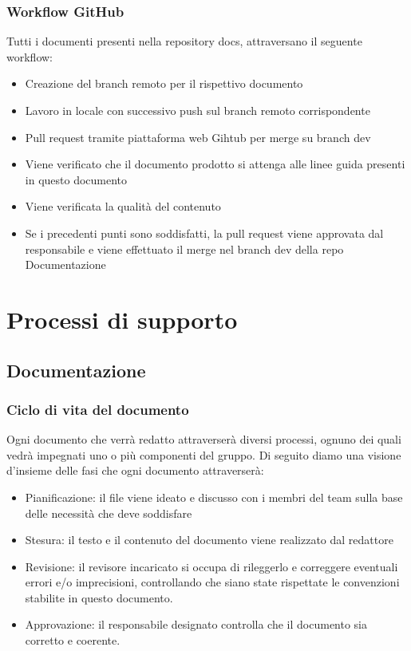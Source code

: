 \documentclass[12pt]{article}
\begin{document}
\subsubsection{Workflow GitHub}
Tutti i documenti presenti nella repository docs, attraversano il seguente workflow:

\begin{itemize}
    \item Creazione del branch remoto per il rispettivo documento
    \item Lavoro in locale con successivo push sul branch remoto corrispondente
    \item Pull request tramite piattaforma web Gihtub per merge su branch dev
    \item Viene verificato che il documento prodotto si attenga alle linee guida presenti in questo documento
    \item Viene verificata la qualità del contenuto 
    \item Se i precedenti punti sono soddisfatti, la pull request viene approvata dal responsabile e viene effettuato il merge nel branch dev della repo Documentazione
\end{itemize}

\section{Processi di supporto}

\subsection{Documentazione}
\subsubsection{Ciclo di vita del documento}
Ogni documento che verrà redatto attraverserà diversi processi, ognuno dei quali vedrà impegnati uno o più componenti del gruppo.
Di seguito diamo una visione d'insieme delle fasi che ogni documento attraverserà:
\begin{itemize}
    \item Pianificazione: il file viene ideato e discusso con i membri del team sulla base delle necessità che deve soddisfare
    \item Stesura: il testo e il contenuto del documento viene realizzato dal redattore
    \item Revisione: il revisore incaricato si occupa di rileggerlo e correggere eventuali errori e/o imprecisioni, controllando che siano state rispettate le convenzioni stabilite in questo documento.
    \item Approvazione: il responsabile designato controlla che il documento sia corretto e coerente.
\end{itemize}
\end{document}
